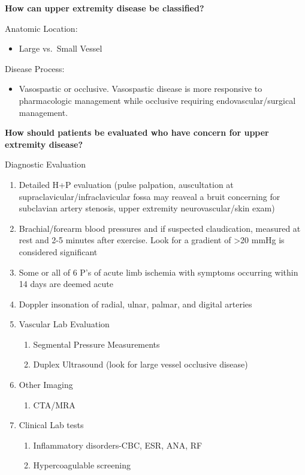 \documentclass[
]{book}
\providecommand{\tightlist}{%
  \setlength{\itemsep}{0pt}\setlength{\parskip}{0pt}}
\begin{document}
\textbf{How can upper extremity disease be classified?}

Anatomic Location:

\begin{itemize}
\tightlist
\item
  Large vs.~Small Vessel
\end{itemize}

Disease Process:

\begin{itemize}
\tightlist
\item
  Vasospastic or occlusive. Vasospastic disease is more responsive to
  pharmacologic management while occlusive requiring
  endovascular/surgical management.
\end{itemize}

\textbf{How should patients be evaluated who have concern for upper extremity
disease?}

Diagnostic Evaluation

\begin{enumerate}
\def\labelenumi{\arabic{enumi}.}
\item
  Detailed H+P evaluation (pulse palpation, auscultation at
  supraclavicular/infraclavicular fossa may reaveal a bruit concerning
  for subclavian artery stenosis, upper extremity neurovascular/skin
  exam)
\item
  Brachial/forearm blood pressures and if suspected claudication,
  measured at rest and 2-5 minutes after exercise. Look for a gradient
  of \textgreater20 mmHg is considered significant
\item
  Some or all of 6 P's of acute limb ischemia with symptoms occurring
  within 14 days are deemed acute
\item
  Doppler insonation of radial, ulnar, palmar, and digital arteries
\item
  Vascular Lab Evaluation

  \begin{enumerate}
  \def\labelenumii{\arabic{enumii}.}
  \item
    Segmental Pressure Measurements
  \item
    Duplex Ultrasound (look for large vessel occlusive disease)
  \end{enumerate}
\item
  Other Imaging

  \begin{enumerate}
  \def\labelenumii{\arabic{enumii}.}
  \tightlist
  \item
    CTA/MRA
  \end{enumerate}
\item
  Clinical Lab tests

  \begin{enumerate}
  \def\labelenumii{\arabic{enumii}.}
  \item
    Inflammatory disorders-CBC, ESR, ANA, RF
  \item
    Hypercoagulable screening
  \end{enumerate}
\end{enumerate}
\end{document}
